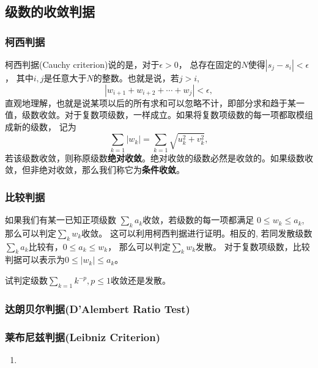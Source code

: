 \subsection{级数的收敛判据}

\subsubsection{柯西判据}
柯西判据(Cauchy criterion)说的是，对于$\epsilon>0$， 总存在固定的$N$使得$|s_j - s_i|< \epsilon$， 其中$i,j$是任意大于$N$的整数。也就是说，若$j>i$,
\begin{equation}
    | w_{i+1} + w_{i+2} + \cdots + w_{j} | < \epsilon ,
\end{equation}
直观地理解，也就是说某项以后的所有求和可以忽略不计，即部分求和趋于某一值，级数收敛。对于复数项级数，一样成立。如果将复数项级数的每一项都取模组成新的级数，
记为
\begin{equation}
    \sum_{k=1} |w_k| = \sum_{k=1}\sqrt { u_k^2 + v_k^2},
\end{equation}
若该级数收敛，则称原级数\textbf{绝对收敛}。绝对收敛的级数必然是收敛的。如果级数收敛，但非绝对收敛，那么我们称它为\textbf{条件收敛}。
\subsubsection{比较判据}
如果我们有某一已知正项级数 $\sum_k a_k$收敛，若级数的每一项都满足 $0 \leq w_k \leq a_k$, 那么可以判定$\sum_k w_k$收敛。
这可以利用柯西判据进行证明。相反的, 若同发散级数$\sum_{k} a_k$比较有，$0 \leq a_k  \leq w_k$， 那么可以判定$\sum_k w_k$发散。
对于复数项级数，比较判据可以表示为$0 \leq |w_k| \leq a_k$。

\begin{examplebox}{试判定级数$\sum_{k=1} k^{-p}, p\leq 1$收敛还是发散。}
    
\end{examplebox}

\subsubsection{达朗贝尔判据(D'Alembert Ratio Test)}

\subsubsection{莱布尼兹判据(Leibniz Criterion)}

\begin{enumerate}
    \item 
\end{enumerate}
